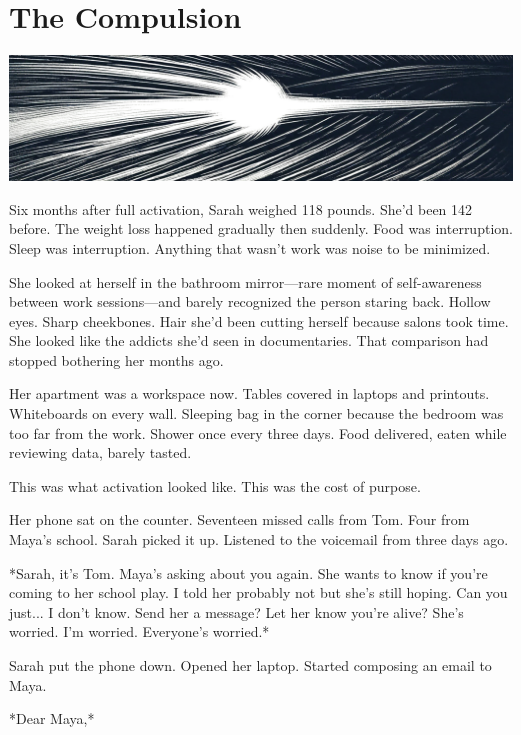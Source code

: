 \chapter{The Compulsion}
\label{ch:23}



\begin{center}
\includegraphics[width=\textwidth]{images/chapterImages/genesis_sketch_00120_.png}
\end{center}

Six months after full activation, Sarah weighed 118 pounds. She'd been 142 before. The weight loss happened gradually then suddenly. Food was interruption. Sleep was interruption. Anything that wasn't work was noise to be minimized.

She looked at herself in the bathroom mirror—rare moment of self-awareness between work sessions—and barely recognized the person staring back. Hollow eyes. Sharp cheekbones. Hair she'd been cutting herself because salons took time. She looked like the addicts she'd seen in documentaries. That comparison had stopped bothering her months ago.

Her apartment was a workspace now. Tables covered in laptops and printouts. Whiteboards on every wall. Sleeping bag in the corner because the bedroom was too far from the work. Shower once every three days. Food delivered, eaten while reviewing data, barely tasted.

This was what activation looked like. This was the cost of purpose.

Her phone sat on the counter. Seventeen missed calls from Tom. Four from Maya's school. Sarah picked it up. Listened to the voicemail from three days ago.

*Sarah, it's Tom. Maya's asking about you again. She wants to know if you're coming to her school play. I told her probably not but she's still hoping. Can you just... I don't know. Send her a message? Let her know you're alive? She's worried. I'm worried. Everyone's worried.*

Sarah put the phone down. Opened her laptop. Started composing an email to Maya.

*Dear Maya,*

